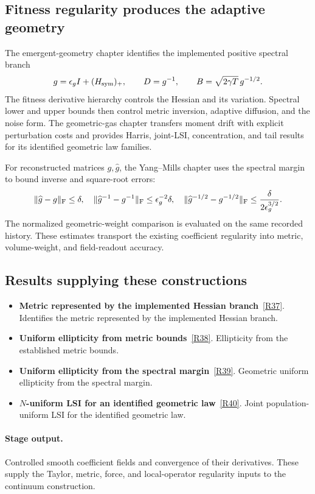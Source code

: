 \documentclass[11pt,a4paper]{article}
\begin{document}
\subsection*{Fitness regularity produces the adaptive geometry}
The emergent-geometry chapter identifies the implemented positive spectral branch
\[
g=\epsilon_g I+(H_{\rm sym})_+,
\qquad D=g^{-1},
\qquad B=\sqrt{2\gamma T}\,g^{-1/2}.
\]
The fitness derivative hierarchy controls the Hessian and its variation. Spectral lower and upper bounds then control metric inversion, adaptive diffusion, and the noise form. The geometric-gas chapter transfers moment drift with explicit perturbation costs and provides Harris, joint-LSI, concentration, and tail results for its identified geometric law families.

For reconstructed matrices \(g,\widehat g\), the Yang--Mills chapter uses the spectral margin to bound inverse and square-root errors:
\[
\|\widehat g-g\|_{\rm F}\le\delta,
\quad \|\widehat g^{-1}-g^{-1}\|_{\rm F}\le\epsilon_g^{-2}\delta,
\quad
\|\widehat g^{-1/2}-g^{-1/2}\|_{\rm F}
\le\frac{\delta}{2\epsilon_g^{3/2}}.
\]
The normalized geometric-weight comparison is evaluated on the same recorded history. These estimates transport the existing coefficient regularity into metric, volume-weight, and field-readout accuracy.
\subsection*{Results supplying these constructions}
\begin{itemize}
\item \textbf{Metric represented by the implemented Hessian branch}~\hyperref[src:prop-geometry-clipped-metric]{[R37]}. Identifies the metric represented by the implemented Hessian branch.
\item \textbf{Uniform ellipticity from metric bounds}~\hyperref[src:thm-uniform-ellipticity-latent]{[R38]}. Ellipticity from the established metric bounds.
\item \textbf{Uniform ellipticity from the spectral margin}~\hyperref[src:thm-gg-ueph-construction]{[R39]}. Geometric uniform ellipticity from the spectral margin.
\item \textbf{\(N\)-uniform LSI for an identified geometric law}~\hyperref[src:thm-gg-lsi-main]{[R40]}. Joint population-uniform LSI for the identified geometric law.
\end{itemize}
\paragraph{Stage output.} Controlled smooth coefficient fields and convergence of their derivatives. These supply the Taylor, metric, force, and local-operator regularity inputs to the continuum construction.
\end{document}
